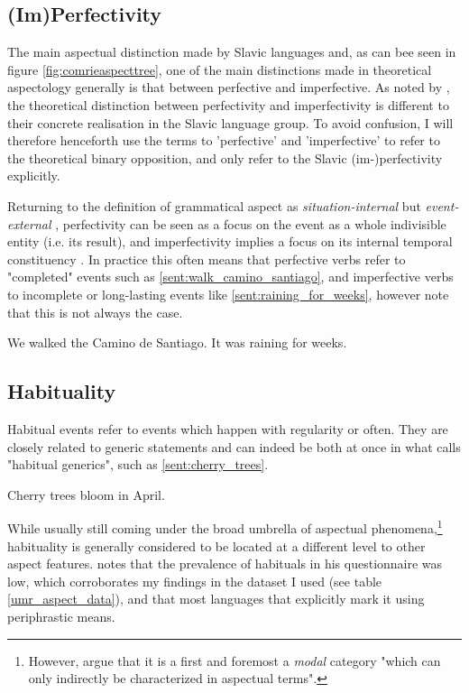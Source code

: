 \subsection*{(Im)Perfectivity}
\label{sec:perfectivity}
The main aspectual distinction made by Slavic languages and, as can bee seen in figure \ref{fig:comrieaspecttree}, one of the main distinctions made in theoretical aspectology generally is that between perfective and imperfective. As noted by \citet{Dahl1985TenseAA}, the theoretical distinction between perfectivity and imperfectivity is different to their concrete realisation in the Slavic language group. To avoid confusion, I will therefore henceforth use the terms to 'perfective' and 'imperfective' to refer to the theoretical binary opposition, and only refer to the Slavic (im-)perfectivity explicitly.

Returning to the definition of grammatical aspect as \emph{situation-internal} but \emph{event-external} \citep{kibort2008aspect}, perfectivity can be seen as a focus on the event as a whole indivisible entity (i.e. its result), and imperfectivity implies a focus on its internal temporal constituency \citep{comrie1976aspect, wals-65}. In practice this often means that perfective verbs refer to "completed" events such as \ref*{sent:walk_camino_santiago}, and imperfective verbs to incomplete or long-lasting events like \ref{sent:raining_for_weeks}, however note that this is not always the case.

\begin{exe}
    \ex We walked the Camino de Santiago.
    \label{sent:walk_camino_santiago}
    \ex It was raining for weeks.
    \label{sent:raining_for_weeks}
\end{exe}
\subsection*{Habituality}
\label{sec:habituality}
Habitual events refer to events which happen with regularity or often. They are closely related to generic statements and can indeed be both at once in what \citep{Dahl1985TenseAA} calls "habitual generics", such as \ref{sent:cherry_trees}.

\begin{exe}
    \ex Cherry trees bloom in April.
\end{exe}
\label{sent:cherry_trees}

While usually still coming under the broad umbrella of aspectual phenomena,\footnote{However, \citet{10.1093/acprof:oso/9780199544325.003.0016} argue that it is a first and foremost a \emph{modal} category "which can only indirectly be characterized in aspectual terms".} habituality is generally considered to be located at a different level to other aspect features. \citet{Dahl1985TenseAA} notes that the prevalence of habituals in his questionnaire was low, which corroborates my findings in the dataset I used (see table \ref{umr_aspect_data}), and that most languages that explicitly mark it using periphrastic means.
